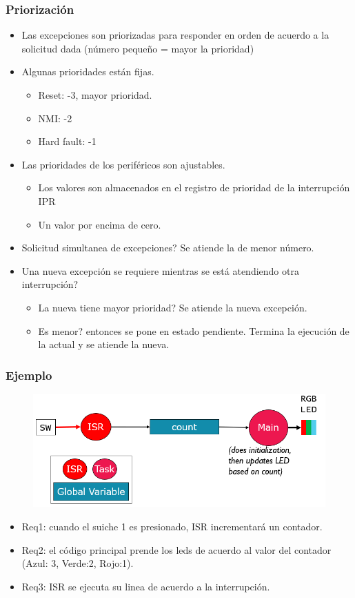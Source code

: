 \documentclass[10.5pt,scale=1.0,t,aspectratio=169,hyperref={pdfpagelabels=false}]{beamer}
\begin{document}
\begin{frame}
	\frametitle{Priorización}
	\begin{itemize}
		\item Las excepciones son priorizadas para responder en orden de acuerdo a la solicitud dada (número pequeño = mayor la prioridad)
		\item Algunas prioridades están fijas.
		\begin{itemize}
			\item Reset: -3, mayor prioridad.
			\item NMI: -2
			\item Hard fault: -1
		\end{itemize}
		\item Las prioridades de los periféricos son ajustables. 
		\begin{itemize}
			\item Los valores son almacenados en el registro de prioridad de la interrupción IPR
			\item Un valor por encima de cero. 
		\end{itemize}
		\item Solicitud simultanea de excepciones? Se atiende la de menor número.
		\item Una nueva excepción se requiere mientras se está atendiendo otra interrupción?
		\begin{itemize}
			\item La nueva tiene mayor prioridad? Se atiende la nueva excepción. 
			\item Es menor? entonces se pone en estado pendiente. Termina la ejecución de la actual y se atiende la nueva. 
		\end{itemize}
	\end{itemize}
\end{frame}
\begin{frame}
	\frametitle{Ejemplo}
	\begin{figure}
		\centering
		\includegraphics[scale=0.4]{03_EjemploInt}
	\end{figure}
	\begin{itemize}
		\item Req1: cuando el suiche 1 es presionado, ISR incrementará un contador.
		\item Req2: el código principal prende los leds de acuerdo al valor del contador (Azul: 3, Verde:2, Rojo:1).
		\item Req3: ISR se ejecuta su linea de acuerdo a la interrupción. 
	\end{itemize}
\end{frame}
\end{document}
